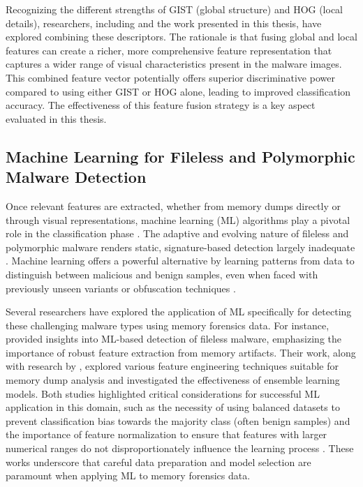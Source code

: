 Recognizing the different strengths of GIST (global structure) and HOG (local details), researchers, including \citet{bozkir2021catch} and the work presented in this thesis, have explored combining these descriptors. The rationale is that fusing global and local features can create a richer, more comprehensive feature representation that captures a wider range of visual characteristics present in the malware images. This combined feature vector potentially offers superior discriminative power compared to using either GIST or HOG alone, leading to improved classification accuracy. The effectiveness of this feature fusion strategy is a key aspect evaluated in this thesis.


\subsection{Machine Learning for Fileless and Polymorphic Malware Detection}
\label{subsec:ml_detection}

Once relevant features are extracted, whether from memory dumps directly or through visual representations, machine learning (ML) algorithms play a pivotal role in the classification phase \citep{gibert2020rise}. The adaptive and evolving nature of fileless and polymorphic malware renders static, signature-based detection largely inadequate \citep{khoje2024revolutionary}. Machine learning offers a powerful alternative by learning patterns from data to distinguish between malicious and benign samples, even when faced with previously unseen variants or obfuscation techniques \citep{khalid2023insight}.

Several researchers have explored the application of ML specifically for detecting these challenging malware types using memory forensics data. For instance, \citet{khalid2023insight} provided insights into ML-based detection of fileless malware, emphasizing the importance of robust feature extraction from memory artifacts. Their work, along with research by \citet{hossain2024enhanced}, explored various feature engineering techniques suitable for memory dump analysis and investigated the effectiveness of ensemble learning models. Both studies highlighted critical considerations for successful ML application in this domain, such as the necessity of using balanced datasets to prevent classification bias towards the majority class (often benign samples) and the importance of feature normalization to ensure that features with larger numerical ranges do not disproportionately influence the learning process \citep{khalid2023insight, hossain2024enhanced}. These works underscore that careful data preparation and model selection are paramount when applying ML to memory forensics data.

